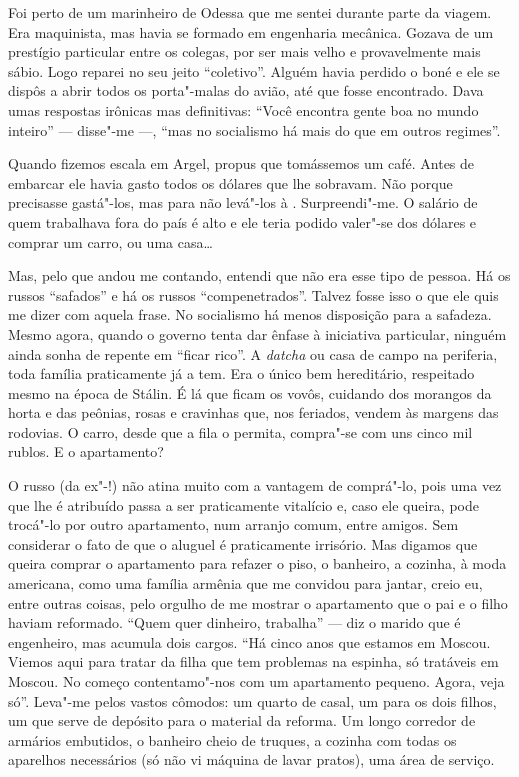 Foi perto de um marinheiro de Odessa que me sentei durante parte da
viagem. Era maquinista, mas havia se formado em engenharia mecânica.
Gozava de um prestígio particular entre os colegas, por ser mais velho e
provavelmente mais sábio. Logo reparei no seu jeito ``coletivo''. Alguém
havia perdido o boné e ele se dispôs a abrir todos os porta"-malas do
avião, até que fosse encontrado. Dava umas respostas irônicas mas
definitivas: ``Você encontra gente boa no mundo inteiro'' --- disse"-me ---,
``mas no socialismo há mais do que em outros regimes''.

Quando fizemos escala em Argel, propus que tomássemos um café. Antes de
embarcar ele havia gasto todos os dólares que lhe sobravam. Não porque
precisasse gastá"-los, mas para não levá"-los à . Surpreendi"-me. O
salário de quem trabalhava fora do país é alto e ele teria podido
valer"-se dos dólares e comprar um carro, ou uma casa\ldots{}

Mas, pelo que andou me contando, entendi que não era esse tipo de
pessoa. Há os russos ``safados'' e há os russos ``compenetrados''.
Talvez fosse isso o que ele quis me dizer com aquela frase. No
socialismo há menos disposição para a safadeza. Mesmo agora, quando o
governo tenta dar ênfase à iniciativa particular, ninguém ainda sonha de
repente em ``ficar rico''. A \emph{datcha} ou casa de campo na
periferia, toda família praticamente já a tem. Era o único bem
hereditário, respeitado mesmo na época de Stálin. É lá que ficam os
vovôs, cuidando dos morangos da horta e das peônias, rosas e cravinhas
que, nos feriados, vendem às margens das rodovias. O carro, desde que a
fila o permita, compra"-se com uns cinco mil rublos. E o apartamento?

O russo (da ex"-!) não atina muito com a vantagem de comprá"-lo, pois
uma vez que lhe é atribuído passa a ser praticamente vitalício e, caso
ele queira, pode trocá"-lo por outro apartamento, num arranjo comum,
entre amigos. Sem considerar o fato de que o aluguel é praticamente
irrisório. Mas digamos que queira comprar o apartamento para refazer o
piso, o banheiro, a cozinha, à moda americana, como uma família armênia
que me convidou para jantar, creio eu, entre outras coisas, pelo orgulho
de me mostrar o apartamento que o pai e o filho haviam reformado. ``Quem
quer dinheiro, trabalha'' --- diz o marido que é engenheiro, mas acumula
dois cargos. ``Há cinco anos que estamos em Moscou. Viemos aqui para
tratar da filha que tem problemas na espinha, só tratáveis em Moscou. No
começo contentamo"-nos com um apartamento pequeno. Agora, veja só''.
Leva"-me pelos vastos cômodos: um quarto de casal, um para os dois
filhos, um que serve de depósito para o material da reforma. Um longo
corredor de armários embutidos, o banheiro cheio de truques, a cozinha
com todas os aparelhos necessários (só não vi máquina de lavar pratos),
uma área de serviço.


